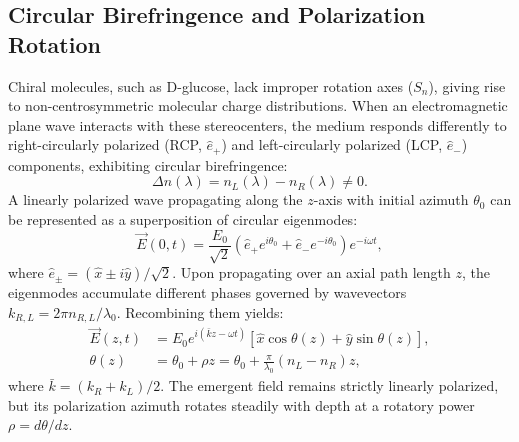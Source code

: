 \documentclass[twocolumn,10pt,a4paper]{article}
\begin{document}
\subsection{Circular Birefringence and Polarization Rotation}
Chiral molecules, such as D-glucose, lack improper rotation axes ($S_n$), giving rise to non-centrosymmetric molecular charge distributions. When an electromagnetic plane wave interacts with these stereocenters, the medium responds differently to right-circularly polarized (RCP, $\hat{e}_+$) and left-circularly polarized (LCP, $\hat{e}_-$) components, exhibiting circular birefringence:
\begin{equation}
  \Delta n(\lambda) = n_L(\lambda) - n_R(\lambda) \neq 0.
  \label{eq:circ_biref}
\end{equation}
A linearly polarized wave propagating along the $z$-axis with initial azimuth $\theta_0$ can be represented as a superposition of circular eigenmodes:
\begin{equation}
  \vec{E}(0, t) = \frac{E_0}{\sqrt{2}} \left( \hat{e}_+ e^{i\theta_0} + \hat{e}_- e^{-i\theta_0} \right) e^{-i\omega t},
  \label{eq:eigenmode_decomp}
\end{equation}
where $\hat{e}_\pm = (\hat{x} \pm i\hat{y})/\sqrt{2}$. Upon propagating over an axial path length $z$, the eigenmodes accumulate different phases governed by wavevectors $k_{R,L} = 2\pi n_{R,L}/\lambda_0$. Recombining them yields:
\begin{align}
  \vec{E}(z, t) &= E_0 e^{i(\bar{k}z - \omega t)} \left[ \hat{x} \cos\theta(z) + \hat{y} \sin\theta(z) \right], \\
  \theta(z) &= \theta_0 + \rho z = \theta_0 + \frac{\pi}{\lambda_0}\left(n_L - n_R\right)z,
  \label{eq:rot_angle}
\end{align}
where $\bar{k} = (k_R + k_L)/2$. The emergent field remains strictly linearly polarized, but its polarization azimuth rotates steadily with depth at a rotatory power $\rho = d\theta/dz$.
\end{document}
